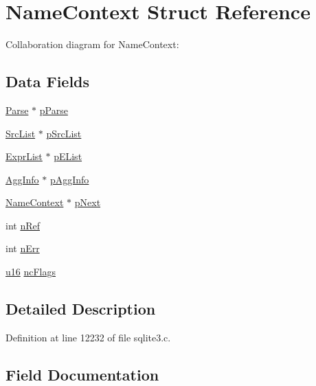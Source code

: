 \hypertarget{struct_name_context}{}\section{Name\+Context Struct Reference}
\label{struct_name_context}


Collaboration diagram for Name\+Context\+:
\subsection*{Data Fields}
\begin{DoxyCompactItemize}
\item 
\hyperlink{struct_parse}{Parse} $\ast$ \hyperlink{struct_name_context_ac700bf257b32cd7e491fde90a081379d}{p\+Parse}
\item 
\hyperlink{struct_src_list}{Src\+List} $\ast$ \hyperlink{struct_name_context_afbf9e5f3766df361d597cbcaba479e1d}{p\+Src\+List}
\item 
\hyperlink{struct_expr_list}{Expr\+List} $\ast$ \hyperlink{struct_name_context_a08025e7aa4f4c6b65204b463580746ef}{p\+E\+List}
\item 
\hyperlink{struct_agg_info}{Agg\+Info} $\ast$ \hyperlink{struct_name_context_a8d44bec2b506e6b367f1de588dbcae27}{p\+Agg\+Info}
\item 
\hyperlink{struct_name_context}{Name\+Context} $\ast$ \hyperlink{struct_name_context_a378641f900e09d4c613d35b2808d1b82}{p\+Next}
\item 
int \hyperlink{struct_name_context_a3c459f9ae278c22b72583c55ca01acb7}{n\+Ref}
\item 
int \hyperlink{struct_name_context_a60ebed73c4dbe105fdc4be21a01fd09c}{n\+Err}
\item 
\hyperlink{sqlite3_8c_a20f2299e322dcbde37cb07b16910b843}{u16} \hyperlink{struct_name_context_a2d901af4a5a0d74082ffb9652c4a0907}{nc\+Flags}
\end{DoxyCompactItemize}


\subsection{Detailed Description}


Definition at line 12232 of file sqlite3.\+c.



\subsection{Field Documentation}
\hypertarget{struct_name_context_a2d901af4a5a0d74082ffb9652c4a0907}{}
